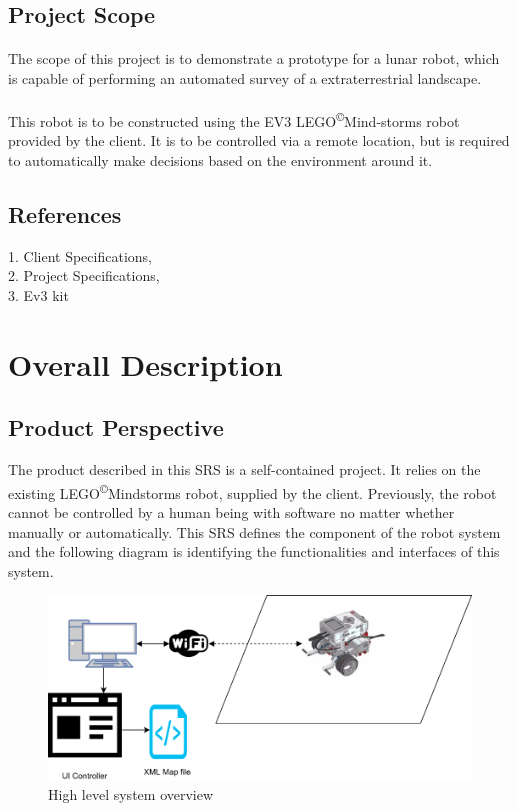\documentclass[10pt,a4paper,titlepage]{article}
\newcommand{\cpright}{\textsuperscript{\tiny\copyright}}
\begin{document}
	\subsection{Project Scope}
	\paragraph{}
	The scope of this project is to demonstrate a prototype for a lunar robot, which is capable of performing an automated survey of a extraterrestrial landscape.
	\paragraph{}
	This robot is to be constructed using the EV3 LEGO\cpright Mind-storms robot provided by the client. It is to be controlled via a remote location, but is required to automatically make decisions based on the environment around it.
	
	\subsection{References}
	1. Client Specifications, \\
	2. Project Specifications, \\
	3. Ev3 kit
	
	\section{Overall Description}
	\subsection{Product Perspective}
	The product described in this SRS is a self-contained project. It relies on the existing LEGO\cpright Mindstorms robot, supplied by the client. Previously, the robot cannot be controlled by a human being with software no matter whether manually or automatically. This SRS defines the component of the robot system and the following diagram is identifying the functionalities and interfaces of this system.
	
	\begin{figure}[H]
		\includegraphics[width=\linewidth]{Robot_system.png}  %
		\caption{High level system overview}
		\label{fig:system overview}				
	\end{figure}
	
\end{document}
